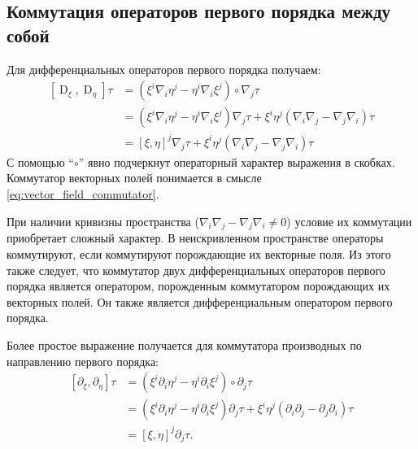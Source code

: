 \documentclass[12pt,a4paper]{article}
\DeclareMathOperator{\D}{D}
\begin{document}
        \subsection{Коммутация операторов первого порядка между собой}

            Для дифференциальных операторов первого порядка получаем:
            \begin{equation}\begin{aligned}
                \left[ \D_\xi, \D_\eta \right] \tau
                    &= (\xi^i \nabla_i \eta^j - \eta^i \nabla_i \xi^j) \circ \nabla_j \tau \\
                    &= (\xi^i \nabla_i \eta^j - \eta^i \nabla_i \xi^j) \nabla_j \tau
                        + \xi^i \eta^j (\nabla_i \nabla_j - \nabla_j \nabla_i) \tau \\
                    &= \left[ \xi, \eta \right]^j \nabla_j \tau
                        + \xi^i \eta^j (\nabla_i \nabla_j - \nabla_j \nabla_i) \tau
            \end{aligned}\end{equation}
            С помощью \enquote{$\circ$} явно подчеркнут операторный характер выражения в скобках. Коммутатор векторных полей понимается в смысле \autoref{eq:vector_field_commutator}.

            При наличии кривизны пространства ($\nabla_i \nabla_j - \nabla_j \nabla_i \neq 0$) условие их коммутации приобретает сложный характер. В неискривленном пространстве операторы коммутируют, если коммутируют порождающие их векторные поля. Из этого также следует, что коммутатор двух дифференциальных операторов первого порядка является оператором, порожденным коммутатором порождающих их векторных полей. Он также является дифференциальным оператором первого порядка.

            Более простое выражение получается для коммутатора производных по направлению первого порядка:
            \begin{equation}\begin{aligned}
                \left[ \partial_\xi, \partial_\eta \right] \tau
                    &= (\xi^i \partial_i \eta^j - \eta^i \partial_i \xi^j) \circ \partial_j \tau \\
                    &= (\xi^i \partial_i \eta^j - \eta^i \partial_i \xi^j) \partial_j \tau
                        + \xi^i \eta^j (\partial_i \partial_j - \partial_j \partial_i) \tau \\
                    &= \left[ \xi, \eta \right]^j \partial_j \tau .
            \end{aligned}\end{equation}
\end{document}
